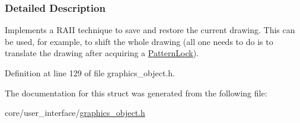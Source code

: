 \subsubsection{Detailed Description}
Implements a R\+A\+II technique to save and restore the current drawing. This can be used, for example, to shift the whole drawing (all one needs to do is to translate the drawing after acquiring a \hyperlink{structslb_1_1core_1_1ui_1_1PatternLock}{Pattern\+Lock}). 

Definition at line 129 of file graphics\+\_\+object.\+h.



The documentation for this struct was generated from the following file\+:\begin{DoxyCompactItemize}
\item 
core/user\+\_\+interface/\hyperlink{graphics__object_8h}{graphics\+\_\+object.\+h}\end{DoxyCompactItemize}
